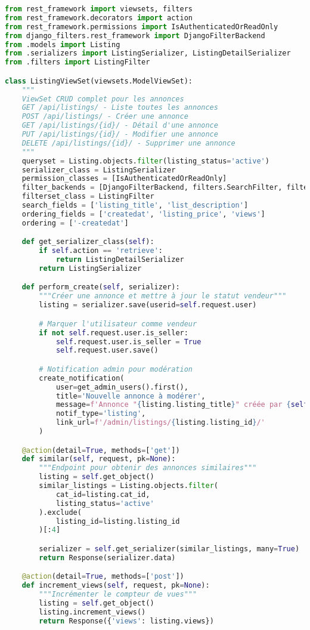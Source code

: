\begin{lstlisting}[language=Python, caption=listings/views.py - ListingViewSet]
from rest_framework import viewsets, filters
from rest_framework.decorators import action
from rest_framework.permissions import IsAuthenticatedOrReadOnly
from django_filters.rest_framework import DjangoFilterBackend
from .models import Listing
from .serializers import ListingSerializer, ListingDetailSerializer
from .filters import ListingFilter

class ListingViewSet(viewsets.ModelViewSet):
    """
    ViewSet CRUD complet pour les annonces
    GET /api/listings/ - Liste toutes les annonces
    POST /api/listings/ - Créer une annonce
    GET /api/listings/{id}/ - Détail d'une annonce
    PUT /api/listings/{id}/ - Modifier une annonce
    DELETE /api/listings/{id}/ - Supprimer une annonce
    """
    queryset = Listing.objects.filter(listing_status='active')
    serializer_class = ListingSerializer
    permission_classes = [IsAuthenticatedOrReadOnly]
    filter_backends = [DjangoFilterBackend, filters.SearchFilter, filters.OrderingFilter]
    filterset_class = ListingFilter
    search_fields = ['listing_title', 'list_description']
    ordering_fields = ['createdat', 'listing_price', 'views']
    ordering = ['-createdat']

    def get_serializer_class(self):
        if self.action == 'retrieve':
            return ListingDetailSerializer
        return ListingSerializer

    def perform_create(self, serializer):
        """Créer une annonce et mettre à jour le statut vendeur"""
        listing = serializer.save(userid=self.request.user)

        # Marquer l'utilisateur comme vendeur
        if not self.request.user.is_seller:
            self.request.user.is_seller = True
            self.request.user.save()

        # Notification admin pour modération
        create_notification(
            user=get_admin_users().first(),
            title='Nouvelle annonce à modérer',
            message=f'Annonce "{listing.listing_title}" créée par {self.request.user.full_name}',
            notif_type='listing',
            link_url=f'/admin/listings/{listing.listing_id}/'
        )

    @action(detail=True, methods=['get'])
    def similar(self, request, pk=None):
        """Endpoint pour obtenir des annonces similaires"""
        listing = self.get_object()
        similar_listings = Listing.objects.filter(
            cat_id=listing.cat_id,
            listing_status='active'
        ).exclude(
            listing_id=listing.listing_id
        )[:4]

        serializer = self.get_serializer(similar_listings, many=True)
        return Response(serializer.data)

    @action(detail=True, methods=['post'])
    def increment_views(self, request, pk=None):
        """Incrémenter le compteur de vues"""
        listing = self.get_object()
        listing.increment_views()
        return Response({'views': listing.views})
\end{lstlisting}

